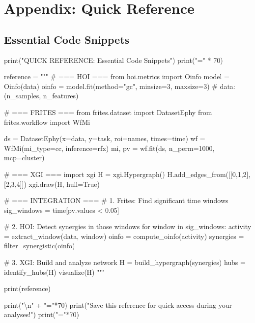 \documentclass[
  11pt,
  letterpaper,
  oneside,
  openany]{book}
\newenvironment{Shaded}{\begin{snugshade}}{\end{snugshade}}
\newcommand{\BuiltInTok}[1]{\textcolor[rgb]{0.00,0.23,0.31}{#1}}
\newcommand{\CharTok}[1]{\textcolor[rgb]{0.13,0.47,0.30}{#1}}
\newcommand{\DecValTok}[1]{\textcolor[rgb]{0.68,0.00,0.00}{#1}}
\newcommand{\NormalTok}[1]{\textcolor[rgb]{0.00,0.23,0.31}{#1}}
\newcommand{\OperatorTok}[1]{\textcolor[rgb]{0.37,0.37,0.37}{#1}}
\newcommand{\StringTok}[1]{\textcolor[rgb]{0.13,0.47,0.30}{#1}}
\begin{document}
\section{Appendix: Quick Reference}\label{appendix-quick-reference}

\subsection{Essential Code Snippets}\label{essential-code-snippets}

\begin{Shaded}
\begin{Highlighting}[]
\BuiltInTok{print}\NormalTok{(}\StringTok{"QUICK REFERENCE: Essential Code Snippets"}\NormalTok{)}
\BuiltInTok{print}\NormalTok{(}\StringTok{"="} \OperatorTok{*} \DecValTok{70}\NormalTok{)}

\NormalTok{reference }\OperatorTok{=} \StringTok{"""}
\StringTok{\# === HOI ===}
\StringTok{from hoi.metrics import Oinfo}
\StringTok{model = Oinfo(data)}
\StringTok{oinfo = model.fit(method="gc", minsize=3, maxsize=3)  \# data: (n\_samples, n\_features)}

\StringTok{\# === FRITES ===}
\StringTok{from frites.dataset import DatasetEphy}
\StringTok{from frites.workflow import WfMi}

\StringTok{ds = DatasetEphy(x=data, y=task, roi=names, times=time)}
\StringTok{wf = WfMi(mi\_type=\textquotesingle{}cc\textquotesingle{}, inference=\textquotesingle{}rfx\textquotesingle{})}
\StringTok{mi, pv = wf.fit(ds, n\_perm=1000, mcp=\textquotesingle{}cluster\textquotesingle{})}

\StringTok{\# === XGI ===}
\StringTok{import xgi}
\StringTok{H = xgi.Hypergraph()}
\StringTok{H.add\_edges\_from([[0,1,2], [2,3,4]])}
\StringTok{xgi.draw(H, hull=True)}

\StringTok{\# === INTEGRATION ===}
\StringTok{\# 1. Frites: Find significant time windows}
\StringTok{sig\_windows = time[pv.values \textless{} 0.05]}

\StringTok{\# 2. HOI: Detect synergies in those windows}
\StringTok{for window in sig\_windows:}
\StringTok{    activity = extract\_window(data, window)}
\StringTok{    oinfo = compute\_oinfo(activity)}
\StringTok{    synergies = filter\_synergistic(oinfo)}

\StringTok{\# 3. XGI: Build and analyze network}
\StringTok{H = build\_hypergraph(synergies)}
\StringTok{hubs = identify\_hubs(H)}
\StringTok{visualize(H)}
\StringTok{"""}

\BuiltInTok{print}\NormalTok{(reference)}

\BuiltInTok{print}\NormalTok{(}\StringTok{"}\CharTok{\textbackslash{}n}\StringTok{"} \OperatorTok{+} \StringTok{"="}\OperatorTok{*}\DecValTok{70}\NormalTok{)}
\BuiltInTok{print}\NormalTok{(}\StringTok{"Save this reference for quick access during your analyses!"}\NormalTok{)}
\BuiltInTok{print}\NormalTok{(}\StringTok{"="}\OperatorTok{*}\DecValTok{70}\NormalTok{)}
\end{Highlighting}
\end{Shaded}
\end{document}
